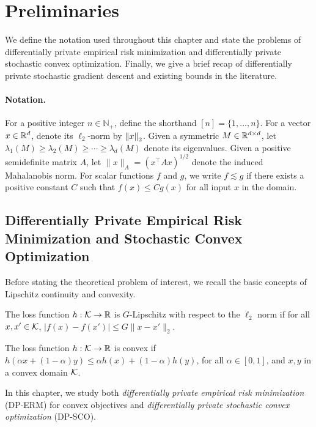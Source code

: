 \section{Preliminaries}
We define the notation used throughout this chapter and state the problems of differentially private empirical risk minimization and differentially private stochastic convex optimization.
Finally, we give a brief recap of differentially private stochastic gradient descent and existing bounds in the literature.

\paragraph{Notation.} 
For a positive integer $n \in \mathbb{N}_+$, define the shorthand $[n] = \{1, \dots, n\}$.
For a vector $x \in \mathbb{R}^d$, denote its $\ell_2$-norm by $\left\lVert x\right\rVert_2$.
Given a symmetric $M \in \mathbb{R}^{d \times d}$, let $\lambda_1(M) \ge \lambda_2(M) \ge \cdots \ge \lambda_d(M)$ denote its eigenvalues.
Given a positive semidefinite matrix $A$, let $\| x \|_A = (x^\top A x)^{1/2}$ denote the induced Mahalanobis norm.
For scalar functions $f$ and $g$, we write $f \lesssim g$ if there exists a positive constant $C$ such that $f(x) \leq C g(x)$ for all input $x$ in the domain.

\subsection{Differentially Private Empirical Risk Minimization and Stochastic Convex Optimization}
Before stating the theoretical problem of interest, we recall the basic concepts of Lipschitz continuity and convexity.
\begin{defi}
The loss function $h:\mathcal K\to\mathbb{R}$ is $G$-Lipschitz with respect to the $\ell_2$ norm if for all $x,x' \in \mathcal K$, $|f(x)-f(x')|\leq G\|x-x'\|_2$.
\end{defi}

\begin{defi}[Convexity]
The loss function $h:\mathcal K\to\mathbb{R}$ is convex if $h(\alpha x + (1 - \alpha) y) \le \alpha h(x) + (1 - \alpha) h(y)$, for all $\alpha \in [0, 1]$, and $x, y$ in a convex domain $\mathcal K$.
\end{defi}

In this chapter, we study both \emph{differentially private empirical risk minimization} (DP-ERM) for convex objectives and \emph{differentially private stochastic convex optimization} (DP-SCO).

